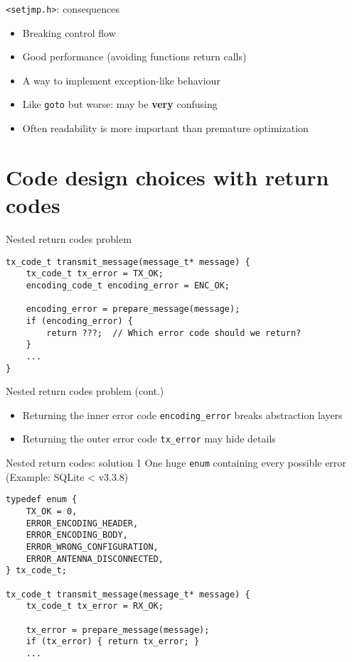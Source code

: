 \documentclass[aspectratio=169,14pt]{beamer}
\begin{document}
\begin{frame}{\texttt{<setjmp.h>}: consequences}
\begin{itemize}
    \item[\good] Breaking control flow
    \item[\good] Good performance (avoiding functions return calls)
    \item[\good] A way to implement exception-like behaviour
    \item[\bad] Like \texttt{goto} but worse: may be \textbf{very} confusing
    \item[\bad] Often readability is more important than premature optimization
\end{itemize}
\end{frame}






\section{Code design choices with return codes}

\begin{frame}[fragile]{Nested return codes problem}
\begin{lstlisting}[style=cstyle]
tx_code_t transmit_message(message_t* message) {
    tx_code_t tx_error = TX_OK;
    encoding_code_t encoding_error = ENC_OK;
    
    encoding_error = prepare_message(message);
    if (encoding_error) {
        return ???;  // Which error code should we return?
    }
    ...
}
\end{lstlisting}
\end{frame}



\begin{frame}{Nested return codes problem (cont.)}
\begin{itemize}
    \item Returning the inner error code \texttt{encoding\_error} breaks abstraction layers
    \item Returning the outer error code \texttt{tx\_error} may hide details
\end{itemize}
\end{frame}



\begin{frame}[fragile]{Nested return codes: solution 1}
One huge \texttt{enum} containing every possible error\\
(Example: SQLite < v3.3.8)

\begin{lstlisting}[style=cstyle]
typedef enum {
    TX_OK = 0,
    ERROR_ENCODING_HEADER,
    ERROR_ENCODING_BODY,
    ERROR_WRONG_CONFIGURATION,
    ERROR_ANTENNA_DISCONNECTED,
} tx_code_t;

tx_code_t transmit_message(message_t* message) {
    tx_code_t tx_error = RX_OK;
    
    tx_error = prepare_message(message);
    if (tx_error) { return tx_error; }
    ...
\end{lstlisting}
\end{frame}
\end{document}
